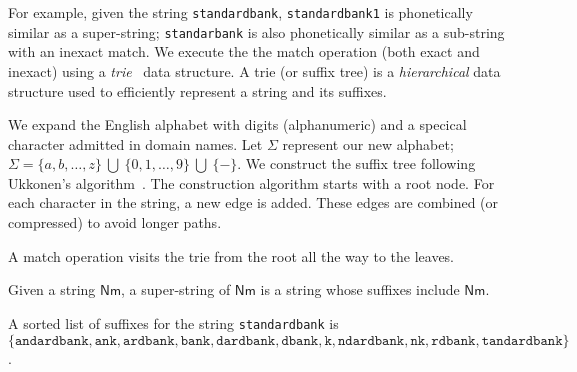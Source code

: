 For example, given the string {\texttt{standardbank}}, {\texttt{standardbank1}} is phonetically similar as a super-string; {\texttt{standarbank}} is also phonetically similar as a sub-string with an inexact match. We execute the the match operation (both exact and inexact) using  a \emph{trie}~\cite{leis-kemper-neumann:2013,morrison:1968,gusfield:1997,ukkonen:1995} data structure. A trie (or suffix tree) is a \emph{hierarchical} data structure used to efficiently represent a string and its suffixes.

We expand the English alphabet with digits (alphanumeric) and a specical character admitted in domain names. Let $\Sigma$ represent our new alphabet; $\Sigma = \{a, b, \ldots, z\}~\bigcup~\{0, 1, \ldots, 9\}~\bigcup~\{-\}$. We construct the suffix tree following Ukkonen's algorithm~\cite{ukkonen:1995}. The construction algorithm starts with a root node. For each character in the string, a new edge is added. These edges are combined (or compressed) to avoid longer paths. 


A match operation visits the trie from the root all the way to the leaves.  



\begin{definition}
  \label{theo:super-strs}
  Given a string $\mathsf{Nm}$, a super-string of $\mathsf{Nm}$ is a string whose suffixes include $\mathsf{Nm}$.
\end{definition}





A sorted list of suffixes for the string {\texttt{standardbank}} is $\{\texttt{andardbank}, \texttt{ank}, \texttt{ardbank}, \texttt{bank}, \texttt{dardbank}, \texttt{dbank}, \texttt{k}, \texttt{ndardbank}, \texttt{nk}, \texttt{rdbank}, \texttt{tandardbank}\}$.



